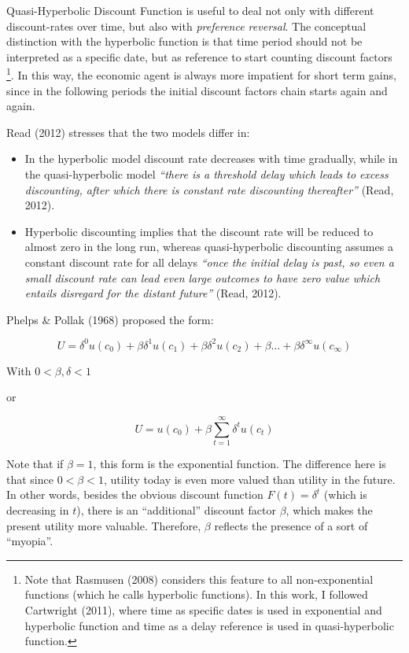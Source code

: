 \documentclass[]{article}
\providecommand{\tightlist}{%
  \setlength{\itemsep}{0pt}\setlength{\parskip}{0pt}}
\begin{document}
Quasi-Hyperbolic Discount Function is useful to deal not only with different discount-rates over time, but also with \emph{preference reversal}. The conceptual distinction with the hyperbolic function is that time period should not be interpreted as a specific date, but as reference to start counting discount factors \footnote{Note that Rasmusen (2008) considers this feature to all non-exponential functions (which he calls hyperbolic functions). In this work, I followed Cartwright (2011), where time as specific dates is used in exponential and hyperbolic function and time as a delay reference is used in quasi-hyperbolic function.}. In this way, the economic agent is always more impatient for short term gains, since in the following periods the initial discount factors chain starts again and again.

Read (2012) stresses that the two models differ in:

\begin{itemize}
\tightlist
\item
  In the hyperbolic model discount rate decreases with time gradually, while in the quasi-hyperbolic model \emph{``there is a threshold delay which leads to excess discounting, after which there is constant rate discounting thereafter''} (Read, 2012).
\item
  Hyperbolic discounting implies that the discount rate will be reduced to almost zero in the long run, whereas quasi-hyperbolic discounting assumes a constant discount rate for all delays \emph{``once the initial delay is past, so even a small discount rate can lead even large outcomes to have zero value which entails disregard for the distant future''} (Read, 2012).
\end{itemize}

Phelps \& Pollak (1968) proposed the form:

\[
U = \delta^0 u(c_{0})+ \beta\delta^1 u(c_{1}) + \beta\delta^2 u(c_{2}) + \beta\dots + \beta\delta^\infty u(c_{\infty}) 
\]

With \(0<\beta, \delta <1\)

or

\[
U = u(c_{0})+ \beta \sum_{t=1}^{\infty}\delta^{t} u(c_{t})
\]

Note that if \(\beta=1\), this form is the exponential function. The difference here is that since \(0<\beta<1\), utility today is even more valued than utility in the future. In other words, besides the obvious discount function \(F(t)=\delta^t\) (which is decreasing in \(t\)), there is an ``additional'' discount factor \(\beta\), which makes the present utility more valuable. Therefore, \(\beta\) reflects the presence of a sort of ``myopia''.
\end{document}
